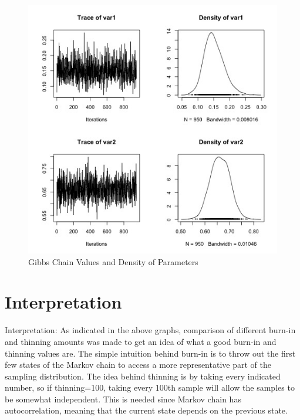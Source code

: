 \documentclass[11pt,a4paper]{article}
\begin{document}
\begin{figure}[h!]
  \includegraphics[scale=0.33]{images/gibbs_5000_100.jpg}
  \caption{Gibbs Chain Values and Density of Parameters}
  \label{fig:birds}
\end{figure}



\newpage

\section*{Interpretation}
Interpretation:
As indicated in the above graphs, comparison of different burn-in and thinning amounts was made to get an idea of what a good burn-in and thinning values are. The simple intuition behind burn-in is to throw out the first few states of the Markov chain to access a more representative part of the sampling distribution. The idea behind thinning is by taking every indicated number, so if thinning=100, taking every 100th sample will allow the samples to be somewhat independent. This is needed since Markov chain has autocorrelation, meaning that the current state depends on the previous state. \\
\end{document}
